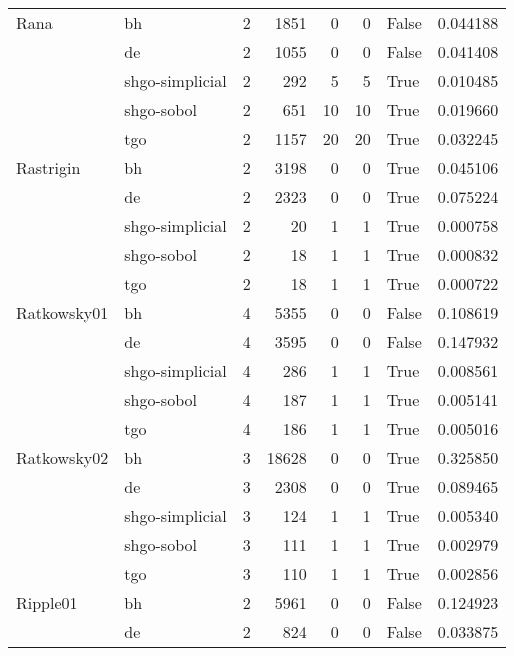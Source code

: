 \begin{longtable}{llrrrrlr}
Rana & bh &     2 &     1851 &      0 &       0 &   False &    0.044188 \\
         & de &     2 &     1055 &      0 &       0 &   False &    0.041408 \\
         & shgo-simplicial &     2 &      292 &      5 &       5 &    True &    0.010485 \\
         & shgo-sobol &     2 &      651 &     10 &      10 &    True &    0.019660 \\
         & tgo &     2 &     1157 &     20 &      20 &    True &    0.032245 \\
Rastrigin & bh &     2 &     3198 &      0 &       0 &    True &    0.045106 \\
         & de &     2 &     2323 &      0 &       0 &    True &    0.075224 \\
         & shgo-simplicial &     2 &       20 &      1 &       1 &    True &    0.000758 \\
         & shgo-sobol &     2 &       18 &      1 &       1 &    True &    0.000832 \\
         & tgo &     2 &       18 &      1 &       1 &    True &    0.000722 \\
Ratkowsky01 & bh &     4 &     5355 &      0 &       0 &   False &    0.108619 \\
         & de &     4 &     3595 &      0 &       0 &   False &    0.147932 \\
         & shgo-simplicial &     4 &      286 &      1 &       1 &    True &    0.008561 \\
         & shgo-sobol &     4 &      187 &      1 &       1 &    True &    0.005141 \\
         & tgo &     4 &      186 &      1 &       1 &    True &    0.005016 \\
Ratkowsky02 & bh &     3 &    18628 &      0 &       0 &    True &    0.325850 \\
         & de &     3 &     2308 &      0 &       0 &    True &    0.089465 \\
         & shgo-simplicial &     3 &      124 &      1 &       1 &    True &    0.005340 \\
         & shgo-sobol &     3 &      111 &      1 &       1 &    True &    0.002979 \\
         & tgo &     3 &      110 &      1 &       1 &    True &    0.002856 \\
Ripple01 & bh &     2 &     5961 &      0 &       0 &   False &    0.124923 \\
         & de &     2 &      824 &      0 &       0 &   False &    0.033875 \\

\end{longtable}
